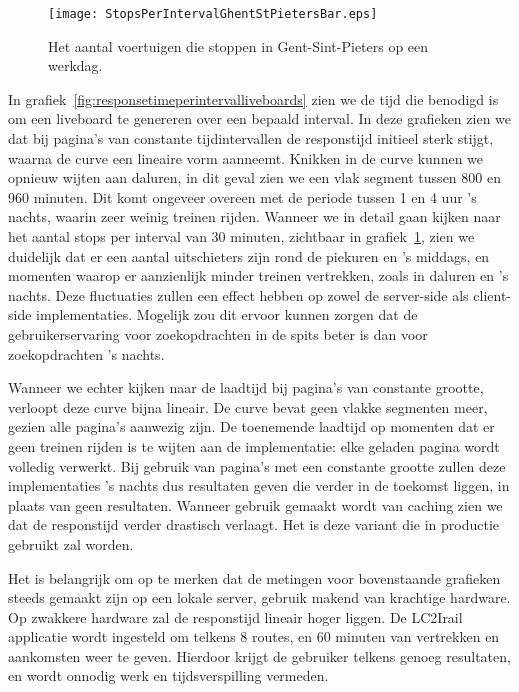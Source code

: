 \begin{figure}[h]
	\centering
	\texttt{[image: StopsPerIntervalGhentStPietersBar.eps]}
	\caption[Het aantal voertuigen die stoppen in Gent-St-Pieters]{Het aantal voertuigen die stoppen in Gent-Sint-Pieters op een werkdag.}
	\label{fig:stopsperintervaldetail}
\end{figure}

In grafiek~\ref{fig:responsetimeperintervalliveboards} zien we de tijd die benodigd is om een liveboard te genereren over een bepaald interval. In deze grafieken zien we dat bij pagina's van constante tijdintervallen de responstijd initieel sterk stijgt, waarna de curve een lineaire vorm aanneemt. Knikken in de curve kunnen we opnieuw wijten aan daluren, in dit geval zien we een vlak segment tussen 800 en 960 minuten. Dit komt ongeveer overeen met de periode tussen 1 en 4 uur 's nachts, waarin zeer weinig treinen rijden. Wanneer we in detail gaan kijken naar het aantal stops per interval van 30 minuten, zichtbaar in grafiek~\ref{fig:stopsperintervaldetail}, zien we duidelijk dat er een aantal uitschieters zijn rond de piekuren en 's middags, en momenten waarop er aanzienlijk minder treinen vertrekken, zoals in daluren en 's nachts. Deze fluctuaties zullen een effect hebben op zowel de server-side als client-side implementaties. Mogelijk zou dit ervoor kunnen zorgen dat de gebruikerservaring voor zoekopdrachten in de spits beter is dan voor zoekopdrachten 's nachts.

Wanneer we echter kijken naar de laadtijd bij pagina's van constante grootte, verloopt deze curve bijna lineair. De curve bevat geen vlakke segmenten meer, gezien alle pagina's aanwezig zijn. De toenemende laadtijd op momenten dat er geen treinen rijden is te wijten aan de implementatie: elke geladen pagina wordt volledig verwerkt. Bij gebruik van pagina's met een constante grootte zullen deze implementaties 's nachts dus resultaten geven die verder in de toekomst liggen, in plaats van geen resultaten. Wanneer gebruik gemaakt wordt van caching zien we dat de responstijd verder drastisch verlaagt. Het is deze variant die in productie gebruikt zal worden. 

Het is belangrijk om op te merken dat de metingen voor bovenstaande grafieken steeds gemaakt zijn op een lokale server, gebruik makend van krachtige hardware. Op zwakkere hardware zal de responstijd lineair hoger liggen. De LC2Irail applicatie wordt ingesteld om telkens 8 routes, en 60 minuten van vertrekken en aankomsten weer te geven. Hierdoor krijgt de gebruiker telkens genoeg resultaten, en wordt onnodig werk en tijdsverspilling vermeden.

